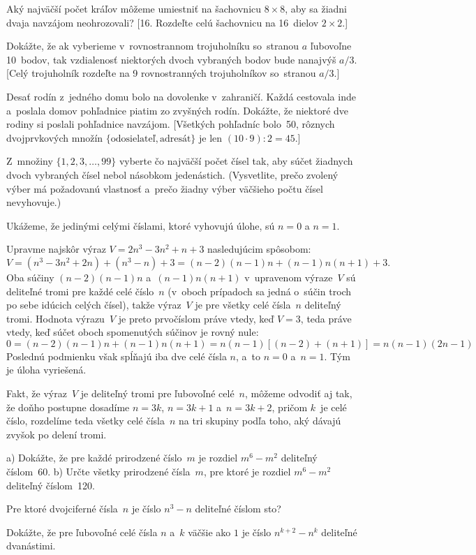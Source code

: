 {Aký najväčší počet kráľov môžeme umiestniť na šachovnicu
$8\times8$, aby sa žiadni dvaja navzájom neohrozovali? [16. Rozdeľte
celú šachovnicu na 16~dielov $2\times2$.]

Dokážte, že ak vyberieme v~rovnostrannom trojuholníku so~stranou $a$ ľubovoľne 10~bodov,
tak vzdialenosť niektorých dvoch vybraných bodov bude nanajvýš
$a/3$. [Celý trojuholník rozdeľte na 9 rovnostranných
trojuholníkov so~stranou $a/3$.]

Desať rodín z~jedného domu bolo na dovolenke v~zahraničí. Každá
cestovala inde a~poslala domov pohľadnice piatim zo zvyšných
rodín. Dokážte, že niektoré dve rodiny si poslali pohľadnice
navzájom. [Všetkých pohľadníc bolo~50, rôznych dvojprvkových množín
$\{\text{odosielateľ},\text{adresát}\}$ je len
$(10\cdot9):2=45$.]

\D
Z~množiny $\{1,2,3,\dots,99\}$ vyberte čo najväčší počet
čísel tak, aby súčet žiadnych dvoch vybraných čísel nebol násobkom
jedenástich. (Vysvetlite, prečo
zvolený výber má požadovanú vlastnosť a~prečo žiadny
výber väčšieho počtu čísel nevyhovuje.)
\vpravo{[58--C--I--5]}
}

{%
Ukážeme, že jedinými celými číslami, ktoré vyhovujú úlohe, sú $n=0$ a ${n=1}$.

Upravme najskôr výraz $V=2n^3-3n^2+n+3$ nasledujúcim spôsobom:
$$
V=(n^3-3n^2+2n)+(n^3-n)+3=(n-2)(n-1)n+(n-1)n(n+1)+3.
$$
Oba súčiny $(n-2)(n-1)n$ a~$(n-1)n(n+1)$ v~upravenom výraze~$V$
sú deliteľné tromi pre každé celé číslo~$n$
(v~oboch prípadoch sa jedná o~súčin troch po sebe idúcich celých čísel),
takže výraz~$V$ je pre všetky celé čísla~$n$
deliteľný tromi. Hodnota výrazu~$V$ je preto prvočíslom práve vtedy, keď
$V=3$, teda práve vtedy, keď súčet oboch spomenutých súčinov je rovný
nule:
$$
0=(n-2)(n-1)n+(n-1)n(n+1)=n(n-1)[(n-2)+(n+1)]=n(n-1)(2n-1)
$$
Poslednú podmienku však spĺňajú iba dve celé čísla $n$,
a~to $n=0$ a~$n=1$. Tým je úloha vyriešená.

\poznamka
Fakt, že výraz~$V$ je deliteľný tromi
pre ľubovoľné celé~$n$, môžeme odvodiť aj tak, že
doňho postupne dosadíme $n=3k$, $n=3k+1$ a~$n=3k+2$, pričom
$k$~je celé číslo,
rozdelíme teda všetky celé čísla~$n$ na tri skupiny podľa toho, aký
dávajú zvyšok po delení tromi.


a) Dokážte, že pre každé prirodzené číslo~$m$ je rozdiel $m^6-m^2$
deliteľný číslom~60.\newline
b) Určte všetky prirodzené čísla~$m$, pre ktoré je rozdiel $m^6-m^2$
deliteľný číslom~120.
\vpravo{[C--55--I--1]}

Pre ktoré dvojciferné čísla~$n$ je číslo $n^{3}-n$ deliteľné číslom sto?
\vpravo{[C--50--S--3]}

\D
Dokážte, že pre ľubovoľné celé čísla $n$ a~$k$ väčšie ako $1$
je číslo $n^{k+2} - n^k$ deliteľné dvanástimi.
\vpravo{[C--59--II--1]}
}

